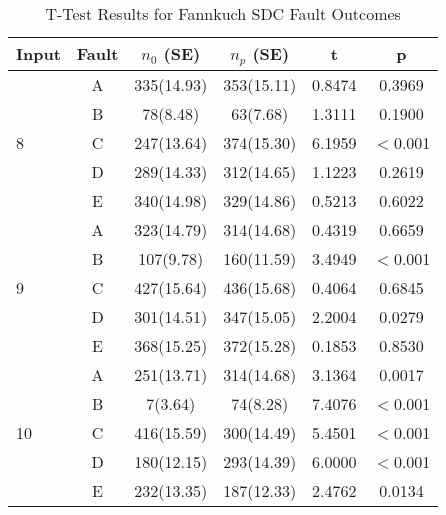 \begin{table}[htbp]
\small{
\begin{center}
    \begin{tabular}{|p{0.7cm}|c|c|c|c|c|}
    \hline
    \textbf{Input} & \textbf{Fault} & \textbf{$n_0$ (SE)} & \textbf{$n_p$ (SE)} & \textbf{t} & \textbf{p} \\ \hline
    \multirow{5}{*}{8}
    & A & 335(14.93) & 353(15.11) & 0.8474 & 0.3969 \\
	& B & 78(8.48) & 63(7.68) & 1.3111 &  0.1900 \\
 	& C & 247(13.64) & 374(15.30) & 6.1959 & $<$0.001 \\
 	& D & 289(14.33) & 312(14.65) & 1.1223 & 0.2619 \\
 	& E & 340(14.98) & 329(14.86) & 0.5213 & 0.6022 \\ \hline
    \multirow{5}{*}{9}
    & A & 323(14.79) & 314(14.68) & 0.4319 & 0.6659 \\
	& B & 107(9.78) & 160(11.59) & 3.4949 & $<$0.001 \\
 	& C & 427(15.64) & 436(15.68) & 0.4064 & 0.6845 \\
 	& D & 301(14.51) & 347(15.05) & 2.2004 & 0.0279 \\
 	& E & 368(15.25) & 372(15.28) & 0.1853 & 0.8530 \\ \hline
 	\multirow{5}{*}{10}
    & A & 251(13.71) & 314(14.68) & 3.1364 & 0.0017 \\
	& B & 7(3.64) & 74(8.28) & 7.4076 & $<$0.001 \\
 	& C & 416(15.59) & 300(14.49) & 5.4501 & $<$0.001 \\
 	& D & 180(12.15) & 293(14.39) & 6.0000 & $<$0.001 \\
 	& E & 232(13.35) & 187(12.33) & 2.4762 & 0.0134 \\ \hline
    \hline
    \end{tabular}
    \end{center}
    }
    \caption{T-Test Results for Fannkuch SDC Fault Outcomes}
    \label{tab:Fannkuch_TTest}
\end{table}

